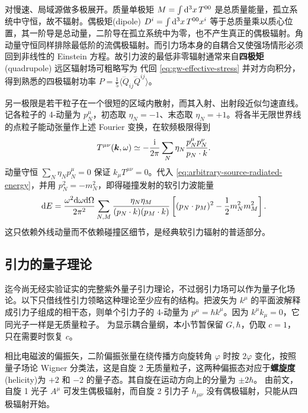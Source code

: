 对慢速、局域源做多极展开。质量单极矩 $M=\int\dd[3]{x} T^{00}$ 是总质量能量，孤立系统中守恒，故不辐射。偶极矩(dipole) $D^i=\int\dd[3]{x} T^{00}x^i$ 等于总质量乘以质心位置，其一阶导是总动量，二阶导在孤立系统中为零，也不产生真正的偶极辐射。角动量守恒同样排除最低阶的流偶极辐射。而引力场本身的自耦合又使强场情形必须回到非线性的 Einstein 方程。故引力波的最低非零辐射通常来自\textbf{四极矩}(quadrupole)
远区辐射场可粗略写为
代回 \eqref{eq:gw-effective-stress} 并对方向积分，得到熟悉的四极辐射功率 $P=\frac{1}{5}\langle\dddot Q_{ij}\dddot Q^{ij}\rangle$。

另一极限是若干粒子在一个很短的区域内散射，而其入射、出射段近似匀速直线。记各粒子的 4-动量为 $p_N^\mu$，初态取 $\eta_N=-1$、末态取 $\eta_N=+1$。将各半无限世界线的点粒子能动张量作上述 Fourier 变换，在软频极限得到
\[
    T^{\mu\nu}(\bm k,\omega)\simeq-\frac{\mathrm{i}}{2\pi}
    \sum_N\eta_N\frac{p_N^\mu p_N^\nu}{p_N\cdot k}.
\]
动量守恒 $\sum_N\eta_Np_N^\mu=0$ 保证 $k_\mu T^{\mu\nu}=0$。代入 \eqref{eq:arbitrary-source-radiated-energy}，并用 $p_N^2=-m_N^2$，即得碰撞发射的软引力波能量
\begin{equation}\label{eq:soft-graviton-radiated-energy}
    \dd E=\frac{\omega^2\dd\omega\dd\Omega}{2\pi^2}
    \sum_{N,M}\frac{\eta_N\eta_M}{(p_N\cdot k)(p_M\cdot k)}
    \left[(p_N\cdot p_M)^2-\frac12m_N^2m_M^2\right].
\end{equation}
这只依赖外线动量而不依赖碰撞区细节，是经典软引力辐射的普适部分。


\subsection{引力的量子理论}\label{sec:quantum-gravity}

迄今尚无经实验证实的完整紫外量子引力理论，不过弱引力场可以作为量子化场论。以下只借线性引力领略这种理论至少应有的结构。把波矢为 $k^\mu$ 的平面波解释成引力子组成的相干态，则单个引力子的 4-动量为 $p^\mu=\hbar k^\mu$。因为 $k^\mu k_\mu=0$，它同光子一样是无质量粒子。
为显示耦合量纲，本小节暂保留 $G,\hbar$，仍取 $c=1$，只在需要时恢复 $c$。

相比电磁波的偏振矢，二阶偏振张量在绕传播方向旋转角 $\varphi$ 时按 $2\varphi$ 变化，按照量子场论 Wigner 分类法，这是自旋 2 无质量粒子，这两种偏振态对应于\textbf{螺旋度}(helicity)为 $+2$ 和 $-2$ 的量子态。其自旋在运动方向上的分量为 $\pm 2\hbar$。
由前文，自旋 1 光子 $A^\mu$ 可发生偶极辐射，而自旋 2 引力子 $h_{\mu\nu}$ 没有偶极辐射，只能从四极辐射开始。

